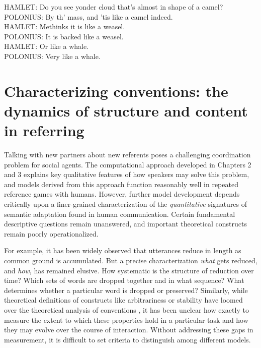 \begin{savequote}[75mm]
HAMLET: Do you see yonder cloud that’s almost in shape of a camel?\\
POLONIUS: By th' mass, and ’tis like a camel indeed.\\
HAMLET: Methinks it is like a weasel.\\
POLONIUS: It is backed like a weasel.\\
HAMLET: Or like a whale.\\
POLONIUS: Very like a whale.\\
\end{savequote}


\chapter{Characterizing conventions: the dynamics of structure and content in referring}
\graphicspath{{./figures/tangrams/}}

Talking with new partners about new referents poses a challenging coordination problem for social agents. 
The computational approach developed in Chapters 2 and 3 explains key qualitative features of how speakers may solve this problem, and models derived from this approach function reasonably well in repeated reference games with humans. 
However, further model development depends critically upon a finer-grained characterization of the \emph{quantitative} signatures of semantic adaptation found in human communication. 
Certain fundamental descriptive questions remain unanswered, and important theoretical constructs remain poorly operationalized. 

For example, it has been widely observed that utterances reduce in length as common ground is accumulated.
But a precise characterization \emph{what} gets reduced, and \emph{how}, has remained elusive.
How systematic is the structure of reduction over time?
Which sets of words are dropped together and in what sequence?
What determines whether a particular word is dropped or preserved? 
Similarly, while theoretical definitions of constructs like arbitrariness or stability have loomed over the theoretical analysis of conventions \cite{Lewis69_Convention}, it has been unclear how exactly to measure the extent to which these properties hold in a particular task and how they may evolve over the course of interaction. 
Without addressing these gaps in measurement, it is difficult to set criteria to distinguish among different models.

